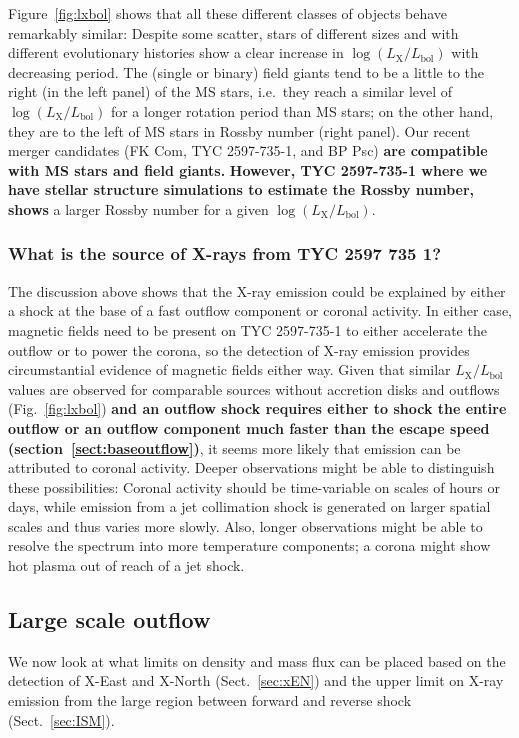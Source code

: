 \documentclass[linenumbers]{aastex631}
\begin{document}
Figure~\ref{fig:lxbol} shows that all these different classes of objects behave remarkably similar: Despite some scatter, stars of different sizes and with different evolutionary histories show a clear increase in $\log(L_\mathrm{X}/L_\mathrm{bol})$ with decreasing period. The (single or binary) field giants tend to be a little to the right (in the left panel) of the MS stars, i.e.\ they reach a similar level of $\log(L_\mathrm{X}/L_\mathrm{bol})$ for a longer rotation period than MS stars; on the other hand, they are to the left of MS stars in Rossby number (right panel). Our recent merger candidates (FK Com, TYC 2597-735-1, and BP Psc) \textbf{are compatible with MS stars and field giants.} 
\textbf{However, TYC 2597-735-1 where we have stellar structure simulations to estimate the Rossby number, shows} a larger Rossby number for a given $\log(L_\mathrm{X}/L_\mathrm{bol})$.

\subsubsection{What is the source of X-rays from TYC 2597 735 1?}
The discussion above shows that the X-ray emission could be explained by either a shock at the base of a fast outflow component or coronal activity. In either case, magnetic fields need to be present on TYC 2597-735-1 to either accelerate the outflow or to power the corona, so the detection of X-ray emission provides circumstantial evidence of magnetic fields either way. Given that similar $L_\mathrm{X}/L_\mathrm{bol}$ values are observed for comparable sources without accretion disks and outflows (Fig.~\ref{fig:lxbol}) \textbf{and an outflow shock requires either to shock the entire outflow or an outflow component much faster than the escape speed (section~\ref{sect:baseoutflow})}, it seems more likely that emission can be attributed to coronal activity. Deeper observations might be able to distinguish these possibilities: Coronal activity should be time-variable on scales of hours or days, while emission from a jet collimation shock is generated on larger spatial scales and thus varies more slowly. Also, longer observations might be able to resolve the spectrum into more temperature components; a corona might show hot plasma out of reach of a jet shock.

\subsection{Large scale outflow}
\label{sec:outflow}
We now look at what limits on density and mass flux can be placed based on the detection of X-East and X-North (Sect.~\ref{sec:xEN}) and the upper limit on X-ray emission from the large region between forward and reverse shock (Sect.~\ref{sec:ISM}).
\end{document}
